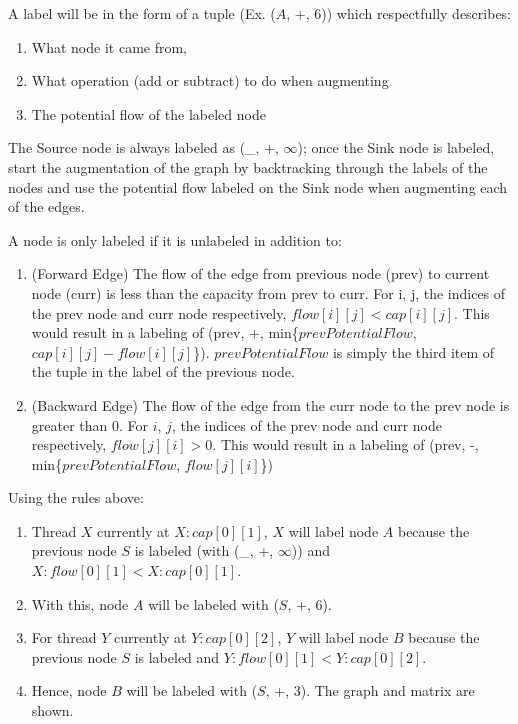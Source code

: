         A label will be in the form of a tuple (Ex. ($A$, +, 6)) which respectfully describes: 
            \begin{enumerate}
                \item What node it came from,
                \item What operation (add or subtract) to do when augmenting
                \item The potential flow of the labeled node
            \end{enumerate}
        The Source node is always labeled as (\_, +, $\infty$); once the Sink node is labeled, start the augmentation of the graph by backtracking through the labels of the nodes and use the potential flow labeled on the Sink node when augmenting each of the edges.
        
        A node is only labeled if it is unlabeled in addition to:
        \begin{enumerate}
            \item (Forward Edge) The flow of the edge from previous node (prev) to current node (curr) is less than the capacity from prev to curr.\newline
            For i, j, the indices of the prev node and curr node respectively, $flow[i][j] < cap[i][j]$. This would result in a labeling of (prev, +, min\{$prevPotentialFlow$, $cap[i][j] - flow[i][j]$\}). $prevPotentialFlow$ is simply the third item of the tuple in the label of the previous node.
            \item (Backward Edge) The flow of the edge from the curr node to the prev node is greater than 0.\newline
            For $i$, $j$, the indices of the prev node and curr node respectively, $flow[j][i] > 0$. This would result in a labeling of (prev, -, min\{$prevPotentialFlow$, $flow[j][i]$\})
        \end{enumerate}
        
        Using the rules above:
        \begin{enumerate}
            \item Thread $X$ currently at $X:cap[0][1]$, $X$ will label node $A$ because the previous node $S$ is labeled (with (\_, +, $\infty$)) and $X:flow[0][1] < X:cap[0][1]$. 
            \item  With this, node $A$ will be labeled with ($S$, +, 6).
            \item For thread $Y$ currently at $Y:cap[0][2]$, $Y$ will label node $B$ because the previous node $S$ is labeled and $Y:flow[0][1] < Y:cap[0][2]$.
            \item  Hence, node $B$ will be labeled with ($S$, +, 3). The graph and matrix are shown.
        \end{enumerate}
        
